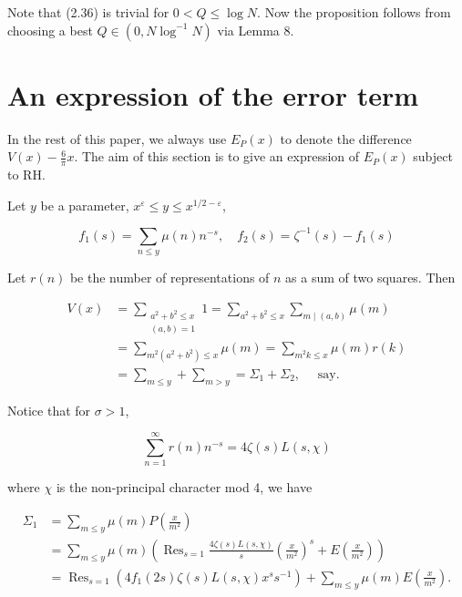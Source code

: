 \documentclass[10pt]{article}
\begin{document}
Note that (2.36) is trivial for $0<Q \leq \log N$. Now the proposition follows from choosing a best $Q \in\left(0, N \log ^{-1} N\right)$ via Lemma 8.\\
\section{An expression of the error term}
In the rest of this paper, we always use $E_{P}(x)$ to denote the difference $V(x)-\frac{6}{\pi} x$. The aim of this section is to give an expression of $E_{P}(x)$ subject to RH.

Let $y$ be a parameter, $x^{\varepsilon} \leq y \leq x^{1 / 2-\varepsilon}$,


\begin{equation*}
f_{1}(s)=\sum_{n \leq y} \mu(n) n^{-s}, \quad f_{2}(s)=\zeta^{-1}(s)-f_{1}(s) \tag{3.1}
\end{equation*}


Let $r(n)$ be the number of representations of $n$ as a sum of two squares. Then


\begin{align*}
V(x) & =\sum_{\substack{a^{2}+b^{2} \leq x \\
(a, b)=1}} 1=\sum_{a^{2}+b^{2} \leq x} \sum_{m \mid(a, b)} \mu(m)  \tag{3.2}\\
& =\sum_{m^{2}\left(a^{2}+b^{2}\right) \leq x} \mu(m)=\sum_{m^{2} k \leq x} \mu(m) r(k) \\
& =\sum_{m \leq y}+\sum_{m>y}=\Sigma_{1}+\Sigma_{2}, \quad \text { say. }
\end{align*}


Notice that for $\sigma>1$,


\begin{equation*}
\sum_{n=1}^{\infty} r(n) n^{-s}=4 \zeta(s) L(s, \chi) \tag{3.3}
\end{equation*}


where $\chi$ is the non-principal character mod 4, we have


\begin{align*}
\Sigma_{1} & =\sum_{m \leq y} \mu(m) P\left(\frac{x}{m^{2}}\right)  \tag{3.4}\\
& =\sum_{m \leq y} \mu(m)\left(\operatorname{Res}_{s=1} \frac{4 \zeta(s) L(s, \chi)}{s}\left(\frac{x}{m^{2}}\right)^{s}+E\left(\frac{x}{m^{2}}\right)\right) \\
& =\operatorname{Res}_{s=1}\left(4 f_{1}(2 s) \zeta(s) L(s, \chi) x^{s} s^{-1}\right)+\sum_{m \leq y} \mu(m) E\left(\frac{x}{m^{2}}\right).
\end{align*}
\end{document}
